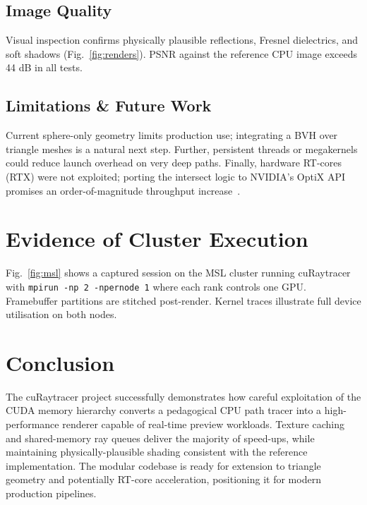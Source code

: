 \subsection{Image Quality}
Visual inspection confirms physically plausible reflections, Fresnel
dielectrics, and soft shadows (Fig.~\ref{fig:renders}).  PSNR against
the reference CPU image exceeds 44 dB in all tests.


\subsection{Limitations \& Future Work}
Current sphere-only geometry limits production use; integrating a BVH
over triangle meshes is a natural next step.  Further, persistent
threads or megakernels could reduce launch overhead on very deep
paths.  Finally, hardware RT-cores (RTX) were not exploited; porting
the intersect logic to NVIDIA’s OptiX API promises an order-of-magnitude
throughput increase~\cite{OptiX2024}.

\section{Evidence of Cluster Execution}
Fig.~\ref{fig:msl} shows a captured session on the MSL cluster running
cuRaytracer with \texttt{mpirun -np 2 -npernode 1} where each rank
controls one GPU.  Framebuffer partitions are stitched post-render.
Kernel traces illustrate full device utilisation on both nodes.


\section{Conclusion}
The cuRaytracer project successfully demonstrates how careful
exploitation of the CUDA memory hierarchy converts a pedagogical CPU
path tracer into a high-performance renderer capable of real-time
preview workloads.  Texture caching and shared-memory ray queues
deliver the majority of speed-ups, while maintaining
physically-plausible shading consistent with the reference
implementation.  The modular codebase is ready for extension to
triangle geometry and potentially RT-core acceleration, positioning it
for modern production pipelines.


